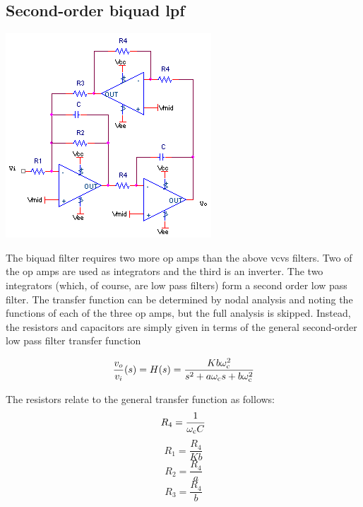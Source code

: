 \subsection{Second-order biquad \acl{lpf}}
\begin{center}
	\includegraphics{schematics/2ndorderbiquadLPfilter.PNG}
\end{center}
The biquad filter requires two more op amps than the above \ac{vcvs} filters.
Two of the op amps are used as integrators and the third is an inverter.
The two integrators (which, of course, are low pass filters) form a second order low pass filter.
The transfer function can be determined by nodal analysis and noting the functions of each of the three op amps, but the full analysis is skipped.
Instead, the resistors and capacitors are simply given in terms of the general second-order low pass filter transfer function

\textcolor{red}{
\begin{equation}
\frac{\vout}{\vin}(s) = \Hs = \frac{Kb\wcutoff^2}{s^2 + a\wcutoff s + b\wcutoff^2}
\label{eq:2ndorderbiquadLPfilter}
\end{equation}
}

The resistors relate to the general transfer function as follows:
\begin{equation}
R_4 = \frac{1}{\omega_\mathrm{c} C}
\end{equation}
\begin{equation}
R_1 = \frac{R_4}{Kb}
\end{equation}
\begin{equation}
R_2 = \frac{R_4}{a}
\end{equation}
\begin{equation}
R_3 = \frac{R_4}{b}
\end{equation}

